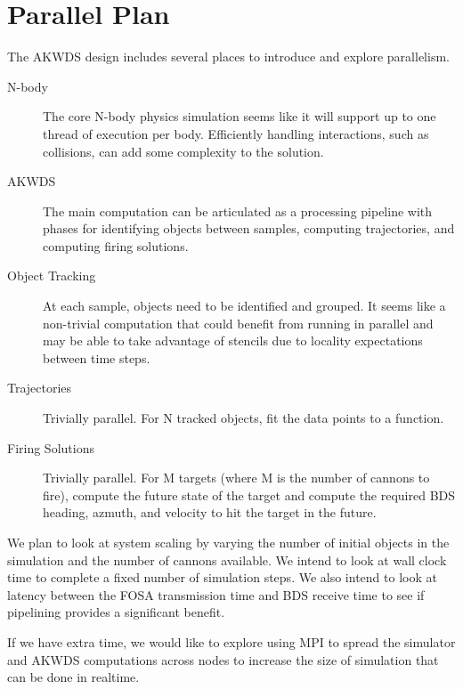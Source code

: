 \chapter*{Parallel Plan}

The AKWDS design includes several places to introduce and explore parallelism.

\begin{description}
\item[N-body] The core N-body physics simulation seems like it will support up to one thread of execution per body. Efficiently handling interactions, such as collisions, can add some complexity to the solution.
\item[AKWDS] The main computation can be articulated as a processing pipeline with phases for identifying objects between samples, computing trajectories, and computing firing solutions.
\item[Object Tracking] At each sample, objects need to be identified and grouped. It seems like a non-trivial computation that could benefit from running in parallel and may be able to take advantage of stencils due to locality expectations between time steps.
\item[Trajectories] Trivially parallel. For N tracked objects, fit the data points to a function.
\item[Firing Solutions] Trivially parallel. For M targets (where M is the number of cannons to fire), compute the future state of the target and compute the required BDS heading, azmuth, and velocity to hit the target in the future.
\end{description}

We plan to look at system scaling by varying the number of initial objects in the simulation and the number of cannons available. We intend to look at wall clock time to complete a fixed number of simulation steps. We also intend to look at latency between the FOSA transmission time and BDS receive time to see if pipelining provides a significant benefit.

If we have extra time, we would like to explore using MPI to spread the simulator and AKWDS computations across nodes to increase the size of simulation that can be done in realtime.